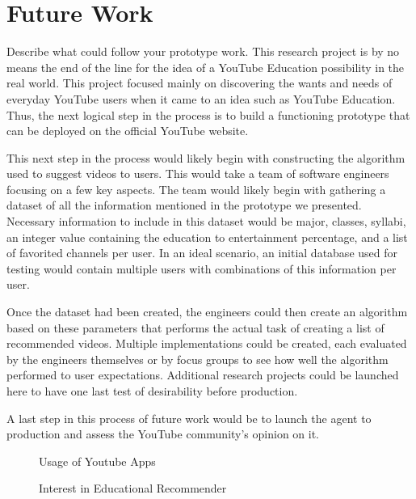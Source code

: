 \documentclass[letterpaper]{article} %
\begin{document}
\section{Future Work}
Describe what could follow your prototype work.
This research project is by no means the end of the line for the idea of a YouTube Education possibility in the real world. This project focused mainly on discovering the wants and needs of everyday YouTube users when it came to an idea such as YouTube Education. Thus, the next logical step in the process is to build a functioning prototype that can be deployed on the official YouTube website.

This next step in the process would likely begin with constructing the algorithm used to suggest videos to users. This would take a team of software engineers focusing on a few key aspects. The team would likely begin with gathering a dataset of all the information mentioned in the prototype we presented. Necessary information to include in this dataset would be major, classes, syllabi, an integer value containing the education to entertainment percentage, and a list of favorited channels per user. In an ideal scenario, an initial database used for testing would contain multiple users with combinations of this information per user.

Once the dataset had been created, the engineers could then create an algorithm based on these parameters that performs the actual task of creating a list of recommended videos. Multiple implementations could be created, each evaluated by the engineers themselves or by focus groups to see how well the algorithm performed to user expectations. Additional research projects could be launched here to have one last test of desirability before production.

A last step in this process of future work would be to launch the agent to production and assess the YouTube community’s opinion on it.

 
\begin{figure} 
	\caption{Usage of Youtube Apps}
	\label{fig:AppsPie}
\end{figure}


\begin{figure}[h]
	\caption{Interest in Educational Recommender}
	\label{fig:InterestPie}
\end{figure}
\end{document}
